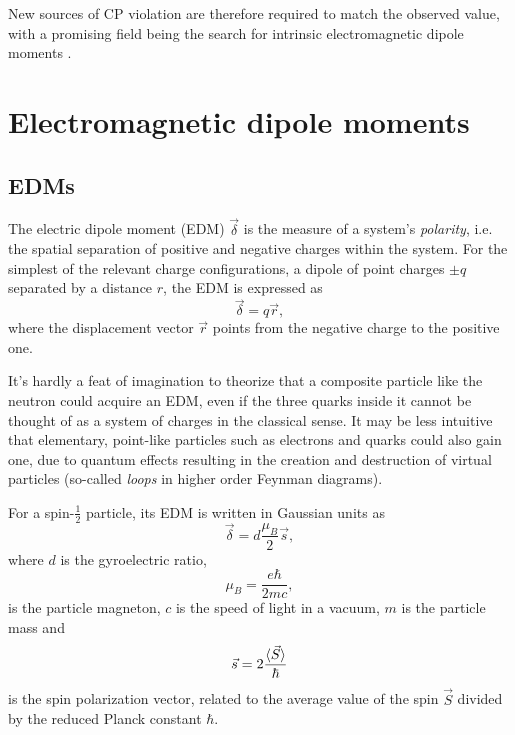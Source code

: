 New sources of CP violation are therefore required to match the observed value, with a promising field being the search for intrinsic electromagnetic dipole moments \cite{cpvws}.

\section{Electromagnetic dipole moments}
\label{sec:emdms}

\subsection{EDMs}
The electric dipole moment (EDM) $\vec{\delta}$ is the measure of a system's \textit{polarity}, i.e. the spatial separation of positive and negative charges within the system.
For the simplest of the relevant charge configurations, a dipole of point charges $\pm q$ separated by a distance $r$, the EDM is expressed as
\begin{equation}
	\vec{\delta} = q \vec{r},
\end{equation}
where the displacement vector $\vec{r}$ points from the negative charge to the positive one.

It's hardly a feat of imagination to theorize that a composite particle like the neutron could acquire an EDM, even if the three quarks inside it cannot be thought of as a system of charges in the classical sense.
It may be less intuitive that elementary, point-like particles such as electrons and quarks could also gain one, due to quantum effects resulting in the creation and destruction of virtual particles (so-called \textit{loops} in higher order Feynman diagrams).

For a spin-$\frac{1}{2}$ particle, its EDM is written in Gaussian units as \cite{EMfeasibility}
\begin{equation}
\vec{\delta} = d \frac{\mu_B}{2} \vec{s},
\end{equation}
where $d$ is the gyroelectric ratio,
\begin{equation}
\mu_B = \frac{e\hbar}{2mc},
\end{equation}
is the particle magneton, $c$ is the speed of light in a vacuum, $m$ is the particle mass and
\begin{equation}
\vec{s} = 2 \frac{\braket{\vec{S}}}{\hbar}
\end{equation}
is the spin polarization vector, related to the average value of the spin $\vec{S}$ divided by the reduced Planck constant $\hbar$.

